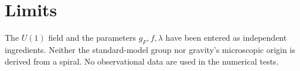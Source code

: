 \documentclass[11pt]{article}
\begin{document}
\section{Limits}
The $U(1)$ field and the parameters $g_F,f,\lambda$ have been entered as independent ingredients. Neither the standard-model group nor gravity's microscopic origin is derived from a spiral. No observational data are used in the numerical tests.
\end{document}
